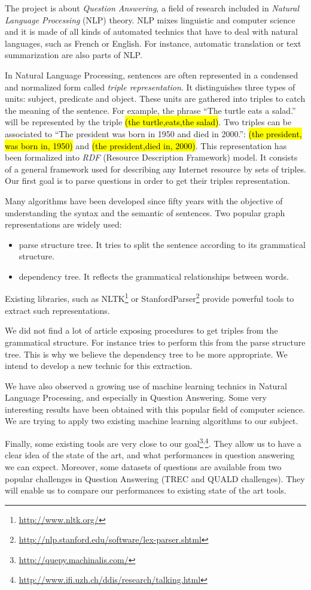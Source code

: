 The project is about \textit{Question Answering}, a field of research included in \textit{Natural Language Processing} (NLP) theory. NLP mixes linguistic and computer science and it is made of all kinds of automated technics that have to deal with natural languages, such as French or English. For instance, automatic translation or text summarization are also parts of NLP.

In Natural Language Processing, sentences are often represented in a condensed and normalized form called \textit{triple representation}. It distinguishes three types of units: subject, predicate and object. These units are gathered into triples to catch the meaning of the sentence. For example, the phrase ``The turtle eats a salad.'' will be represented by the triple \hl{(the turtle,eats,the salad)}. Two triples can be associated to ``The president was born in 1950 and died in 2000.'': \hl{(the president, was born in, 1950)} and \hl{(the president,died in, 2000)}. This representation has been formalized into \textit{RDF} (Resource Description Framework) model. It consists of a general framework used for describing any Internet resource by sets of triples. Our first goal is to parse questions in order to get their triples representation.

Many algorithms have been developed since fifty years with the objective of understanding the syntax and the semantic of sentences. Two popular graph representations are widely used:
\begin{itemize}
 \item parse structure tree. It tries to split the sentence according to its grammatical structure.
 \item dependency tree. It reflects the grammatical relationships between words.
\end{itemize}
Existing libraries, such as NLTK\footnote{\url{http://www.nltk.org/}} or StanfordParser\footnote{\url{http://nlp.stanford.edu/software/lex-parser.shtml}} provide powerful tools to extract such representations.

We did not find a lot of article exposing procedures to get triples from the grammatical structure. For instance \cite{tripleparsetree} tries to perform this from the parse structure tree. This is why we believe the dependency tree to be more appropriate. We intend to develop a new technic for this extraction.

We have also observed a growing use of machine learning technics in Natural Language Processing, and especially in Question Answering. Some very interesting results have been obtained with this popular field of computer science. We are trying to apply two existing machine learning algorithms to our subject.

Finally, some existing tools are very close to our goal\footnote{\url{http://quepy.machinalis.com/}}\textsuperscript{,}\footnote{\url{http://www.ifi.uzh.ch/ddis/research/talking.html}}. They allow us to have a clear idea of the state of the art, and what performances in question answering we can expect. Moreover,  some datasets of questions are available from two popular challenges in Question Answering (TREC and QUALD challenges). They will enable us to compare our performances to existing state of the art tools.
